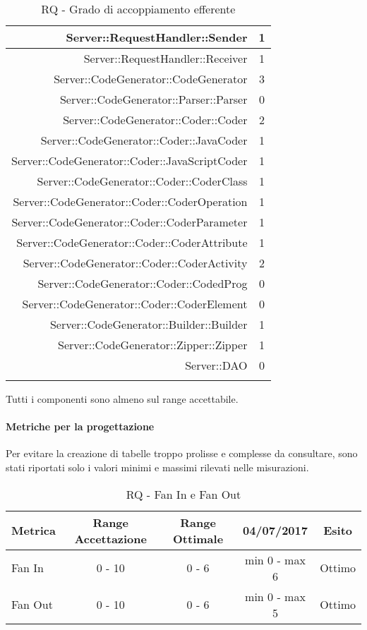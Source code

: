 \documentclass[../PianoDiQualifica.tex]{subfiles}
\begin{document}
\begin{longtable}{|r|c|}
						Server::RequestHandler::Sender & 1 \\ \hline
						Server::RequestHandler::Receiver & 1 \\ \hline
						Server::CodeGenerator::CodeGenerator & 3 \\ \hline
						Server::CodeGenerator::Parser::Parser & 0 \\ \hline
						Server::CodeGenerator::Coder::Coder & 2 \\ \hline
						Server::CodeGenerator::Coder::JavaCoder & 1\\ \hline
						Server::CodeGenerator::Coder::JavaScriptCoder & 1\\ \hline
						Server::CodeGenerator::Coder::CoderClass & 1\\ \hline
						Server::CodeGenerator::Coder::CoderOperation & 1\\ \hline
						Server::CodeGenerator::Coder::CoderParameter & 1\\ \hline
						Server::CodeGenerator::Coder::CoderAttribute & 1\\ \hline
						Server::CodeGenerator::Coder::CoderActivity & 2\\ \hline
						Server::CodeGenerator::Coder::CodedProg & 0\\ \hline
						Server::CodeGenerator::Coder::CoderElement & 0\\ \hline
						Server::CodeGenerator::Builder::Builder & 1 \\ \hline
						Server::CodeGenerator::Zipper::Zipper & 1 \\ \hline
						Server::DAO & 0 \\ \hline
					\caption{RQ - Grado di accoppiamento efferente}
					\end{longtable}
					Tutti i componenti sono almeno sul range accettabile.
					\paragraph{Metriche per la progettazione\\}
						Per evitare la creazione di tabelle troppo prolisse e complesse da consultare,
						sono stati riportati solo i valori minimi e massimi rilevati nelle misurazioni.
						\begin{table}[H]
							\center
							\begin{tabular}{|l|c|c|c|c|}
								\hline
								\rowcolor{blue!30}\textbf{Metrica} & \textbf{Range Accettazione} & \textbf{Range Ottimale}&\textbf{04/07/2017}&\textbf{Esito} \\ \hline
								Fan In & 0 - 10 & 0 - 6 & min 0 - max 6 & Ottimo \\ \hline
								Fan Out & 0 - 10 & 0 - 6 & min 0 - max 5	& Ottimo \\ \hline
							\end{tabular}
							\caption{RQ - Fan In e Fan Out}
						\end{table}
\end{document}
